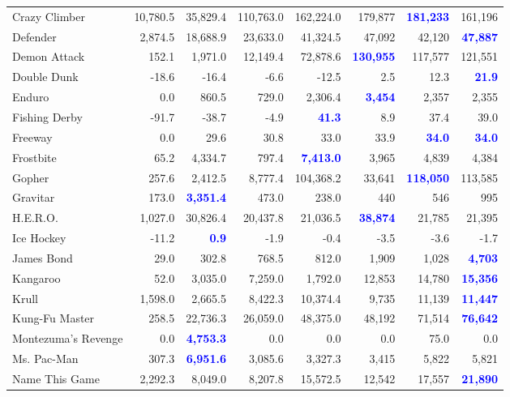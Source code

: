 \documentclass[letterpaper]{article}
\begin{document}
\begin{figure}
\begin{tabular}{ l | r|r|r|r|r|r| r }
Crazy Climber & 10,780.5 & 35,829.4 & 110,763.0 & 162,224.0 & 179,877 & \textbf{\textcolor{blue}{181,233}} & 161,196 \\
Defender & 2,874.5 & 18,688.9 & 23,633.0 & 41,324.5 & 47,092 & 42,120 & \textbf{\textcolor{blue}{47,887}} \\
Demon Attack & 152.1 & 1,971.0 & 12,149.4 & 72,878.6 & \textbf{\textcolor{blue}{130,955}} & 117,577 & 121,551 \\
Double Dunk & -18.6 & -16.4 & -6.6 & -12.5 & 2.5 & 12.3 & \textbf{\textcolor{blue}{21.9}} \\
Enduro & 0.0 & 860.5 & 729.0 & 2,306.4 & \textbf{\textcolor{blue}{3,454}} & 2,357 & 2,355 \\
Fishing Derby & -91.7 & -38.7 & -4.9 & \textbf{\textcolor{blue}{41.3}} & 8.9 & 37.4 & 39.0 \\
Freeway & 0.0 & 29.6 & 30.8 & 33.0 & 33.9 & \textbf{\textcolor{blue}{34.0}} & \textbf{\textcolor{blue}{34.0}} \\
Frostbite & 65.2 & 4,334.7 & 797.4 & \textbf{\textcolor{blue}{7,413.0}} & 3,965 & 4,839 & 4,384 \\
Gopher & 257.6 & 2,412.5 & 8,777.4 & 104,368.2 & 33,641 & \textbf{\textcolor{blue}{118,050}} & 113,585 \\
Gravitar & 173.0 & \textbf{\textcolor{blue}{3,351.4}} & 473.0 & 238.0 & 440 & 546 & 995 \\
H.E.R.O. & 1,027.0 & 30,826.4 & 20,437.8 & 21,036.5 & \textbf{\textcolor{blue}{38,874}} & 21,785 & 21,395 \\
Ice Hockey & -11.2 & \textbf{\textcolor{blue}{0.9}} & -1.9 & -0.4 & -3.5 & -3.6 & -1.7 \\
James Bond & 29.0 & 302.8 & 768.5 & 812.0 & 1,909 & 1,028 & \textbf{\textcolor{blue}{4,703}} \\
Kangaroo & 52.0 & 3,035.0 & 7,259.0 & 1,792.0 & 12,853 & 14,780 & \textbf{\textcolor{blue}{15,356}} \\
Krull & 1,598.0 & 2,665.5 & 8,422.3 & 10,374.4 & 9,735 & 11,139 & \textbf{\textcolor{blue}{11,447}} \\
Kung-Fu Master & 258.5 & 22,736.3 & 26,059.0 & 48,375.0 & 48,192 & 71,514 & \textbf{\textcolor{blue}{76,642}} \\
Montezuma's Revenge & 0.0 & \textbf{\textcolor{blue}{4,753.3}} & 0.0 & 0.0 & 0.0 & 75.0 & 0.0 \\
Ms. Pac-Man & 307.3 & \textbf{\textcolor{blue}{6,951.6}} & 3,085.6 & 3,327.3 & 3,415 & 5,822 & 5,821 \\
Name This Game & 2,292.3 & 8,049.0 & 8,207.8 & 15,572.5 & 12,542 & 17,557 & \textbf{\textcolor{blue}{21,890}} \\

\end{tabular}
\end{figure}
\end{document}
